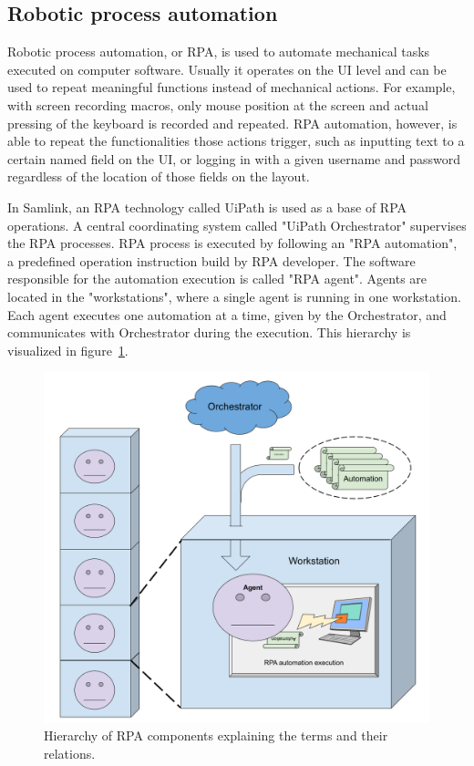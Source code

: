 \subsection{Robotic process automation}\label{subsec:bg-rpa}

Robotic process automation, or RPA,
is used to automate mechanical tasks executed on computer software.
Usually it operates on the UI level
and can be used to repeat meaningful functions
instead of mechanical actions.
For example, with screen recording macros,
only mouse position at the screen and actual pressing of the keyboard
is recorded and repeated.
RPA automation, however,
is able to repeat the functionalities those actions trigger,
such as inputting text to a certain named field on the UI,
or logging in with a given username and password
regardless of the location of those fields on the layout.~\cite{tripathi2018learning}

In Samlink,
an RPA technology called UiPath is used as a base of RPA operations.
A central coordinating system called "UiPath Orchestrator"
supervises the RPA processes.
RPA process is executed by following
an "RPA automation",
a predefined operation instruction build by RPA developer.
The software responsible for the automation execution
is called "RPA agent".
Agents are located in the "workstations",
where a single agent is running in one workstation.
Each agent executes one automation at a time,
given by the Orchestrator,
and communicates with Orchestrator during the execution.
This hierarchy is visualized in figure~\ref{fig:rpa-hierarchy}.

\begin{figure}[htb]
    \centering
    \includegraphics[width=\textwidth,]{./appendices/RPA-hierarchy}
    \caption{Hierarchy of RPA components explaining the terms and their relations.
    \label{fig:rpa-hierarchy}}
\end{figure}


